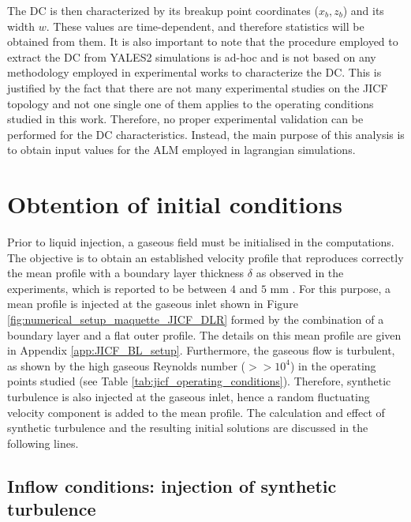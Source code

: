 The DC is then characterized by its breakup point coordinates ($x_b, z_b$) and its width $w$. These values are time-dependent, and therefore statistics will be obtained from them. It is also important to note that the procedure employed to extract the DC from YALES2 simulations is ad-hoc and is not based on any methodology employed in experimental works to characterize the DC. This is justified by the fact that there are not many experimental studies on the JICF topology and not one single one of them applies to the operating conditions studied in this work. Therefore, no proper experimental validation can be performed for the DC characteristics. Instead, the main purpose of this analysis is to obtain input values for the ALM employed in lagrangian simulations.






\section{Obtention of initial conditions}
\label{sec:ch5_initial_conditions}

Prior to liquid injection, a gaseous field must be initialised in the computations. The objective is to obtain an established velocity profile that reproduces correctly the mean profile with a boundary layer thickness $\delta$ as observed in the experiments, which is reported to be between $4$ and $5$ mm . For this purpose, a mean profile is injected at the gaseous inlet shown in Figure \ref{fig:numerical_setup_maquette_JICF_DLR} formed by the combination of a boundary layer and a flat outer profile. The details on this mean profile are given in Appendix \ref{app:JICF_BL_setup}. Furthermore, the gaseous flow is turbulent, as shown by the high gaseous Reynolds number ($>> 10^4$) in the operating points studied (see Table \ref{tab:jicf_operating_conditions}). Therefore, synthetic turbulence is also injected at the gaseous inlet, hence a random fluctuating velocity component is added to the mean profile. The calculation and effect of synthetic turbulence and the resulting initial solutions are discussed in the following lines.


\subsection{Inflow conditions: injection of synthetic turbulence}
\label{subsec:ch5_inflow_conditions_synthetic_turbulence}

